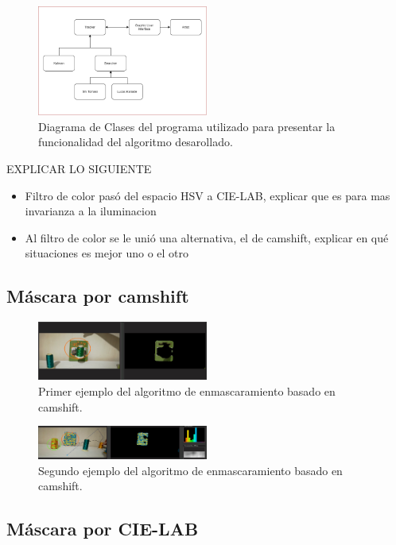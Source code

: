 \begin{figure}
\centering
	\includegraphics[width=0.5\textwidth]{Imagenes/classd.png}
	\caption{Diagrama de Clases del programa utilizado para presentar la funcionalidad del algoritmo desarollado.}
	\label{fig:class}
\end{figure}
EXPLICAR LO SIGUIENTE
\begin{itemize}
\item Filtro de color pasó del espacio HSV a CIE-LAB, explicar que es para mas invarianza a la iluminacion
\item Al filtro de color se le unió una alternativa, el de camshift, explicar en qué situaciones es mejor uno o el otro
\end{itemize}
\subsection{Máscara por camshift}
\begin{figure}
\centering
	\includegraphics[width=0.5\textwidth]{Imagenes/camshift_mask1.png}
	\caption{Primer ejemplo del algoritmo de enmascaramiento basado en camshift.}
	\label{fig:c_mask1}
\end{figure}
\begin{figure}
\centering
	\includegraphics[width=0.5\textwidth]{Imagenes/camshift_mask2.png}
	\caption{Segundo ejemplo del algoritmo de enmascaramiento basado en camshift.}
	\label{fig:c_mask2}
\end{figure}
\subsection{Máscara por CIE-LAB}




